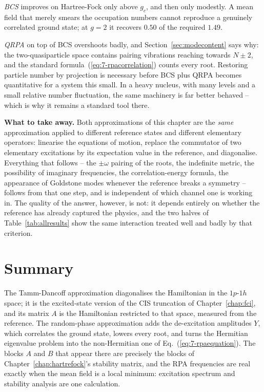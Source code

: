 \emph{BCS} improves on Hartree-Fock only above $g_c$, and then only modestly.
A mean field that merely smears the occupation numbers cannot reproduce a
genuinely correlated ground state; at $g=2$ it recovers $0.50$ of the required
$1.49$.

\emph{QRPA} on top of BCS overshoots badly, and
Section~\ref{sec:modecontent} says why: the two-quasiparticle space contains
pairing vibrations reaching towards $N\pm2$, and the standard
formula~(\ref{eq:7-rpacorrelation}) counts every root.  Restoring particle
number by projection is necessary before BCS plus QRPA becomes quantitative
for a system this small.  In a heavy nucleus, with many levels and a small
relative number fluctuation, the same machinery is far better behaved -- which
is why it remains a standard tool there.

\begin{notebox}
\textbf{What to take away.}  Both approximations of this chapter are the
\emph{same} approximation applied to different reference states and different
elementary operators: linearise the equations of motion, replace the
commutator of two elementary excitations by its expectation value in the
reference, and diagonalise.  Everything that follows -- the $\pm\omega$
pairing of the roots, the indefinite metric, the possibility of imaginary
frequencies, the correlation-energy formula, the appearance of Goldstone modes
whenever the reference breaks a symmetry -- follows from that one step, and is
independent of which channel one is working in.  The quality of the answer,
however, is not: it depends entirely on whether the reference has already
captured the physics, and the two halves of Table~\ref{tab:allresults} show
the same interaction treated well and badly by that criterion.
\end{notebox}

\section{Summary}
\label{sec:ch7summary}

The Tamm-Dancoff approximation diagonalises the Hamiltonian in the
$1p$-$1h$ space; it is the excited-state version of the CIS truncation of
Chapter~\ref{chap:fci}, and its matrix $A$ is the Hamiltonian restricted to
that space, measured from the reference.  The random-phase approximation adds
the de-excitation amplitudes $Y$, which correlates the ground state, lowers
every root, and turns the Hermitian eigenvalue problem into the non-Hermitian
one of Eq.~(\ref{eq:7-rpaequation}).  The blocks $A$ and $B$ that appear there
are precisely the blocks of Chapter~\ref{chap:hartrefock}'s stability matrix,
and the RPA frequencies are real exactly when the mean field is a local
minimum: excitation spectrum and stability analysis are one calculation.

